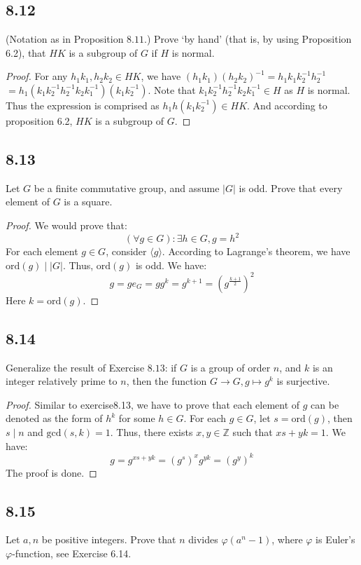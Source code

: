 \documentclass[a4paper, pdf, 12pt]{article}
\begin{document}
\subsection*{8.12}
(Notation as in Proposition $8.11.$) Prove ‘by hand’ (that is, by using Proposition 6.2), that $HK$ 
is a subgroup of $G$ if $H$ is normal.
\begin{proof}
  For any $h_1k_1, h_2k_2\in HK$, we have $(h_1k_1)(h_2k_2)^{-1} = h_1k_1k_2^{-1}h_2^{-1}$
  $=h_1(k_1k_2^{-1}h_2^{-1}k_2k_1^{-1})(k_1k_2^{-1})$. Note that $k_{1}k_{2}^{-1}h_{2}^{-1}k_{2}k_{1}^{-1}\in H$ 
  as $H$ is normal. Thus the expression is comprised as $h_{1}h(k_1k_2^{-1}) \in HK$. And according to 
  proposition 6.2, $HK$ is a subgroup of $G$.
\end{proof}

\subsection*{8.13}
Let $G$ be a finite commutative group, and assume $\lvert G\rvert$ is odd. Prove that
every element of $G$ is a square.
\begin{proof}
  We would prove that:
  $$
  (\forall g\in G): \exists h\in G, g = h^{2}
  $$
  For each element $g\in G$, consider $\langle g\rangle$. According to Lagrange’s theorem, 
  we have $\mbox{ord}(g) \mid \lvert G \rvert$. Thus, $\mbox{ord}(g)$ is odd. We have:
  $$
  g = ge_{G} = gg^{k} = g^{k+1} = (g^{\frac{k+1}{2}})^{2}
  $$ Here $k = \mbox{ord}(g)$.
\end{proof}

\subsection*{8.14}
Generalize the result of Exercise $8.13$: if $G$ is a group of order $n$, and $k$ is an
integer relatively prime to $n$, then the function $G \rightarrow G, g \mapsto g^{k}$ is surjective.
\begin{proof}
  Similar to exercise8.13, we have to prove that each element of $g$ can be denoted as the form of $h^{k}$ for some 
  $h\in G$. 
  For each $g\in G$, let $s = \mbox{ord}(g)$, then $s\mid n$ and $\mbox{gcd}(s, k) = 1$. 
  Thus, there exists $x, y\in \mathbb{Z}$ such that $xs + yk = 1$. We have:
  $$
  g = g^{xs + yk} = (g^{s})^{x}g^{yk} = (g^{y})^{k}
  $$
  The proof is done.
\end{proof}

\subsection*{8.15}
Let $a, n$ be positive integers. Prove that $n$ divides $\varphi(a^{n} - 1)$, where $\varphi$ is
Euler’s $\varphi$-function, see Exercise 6.14.
\end{document}
